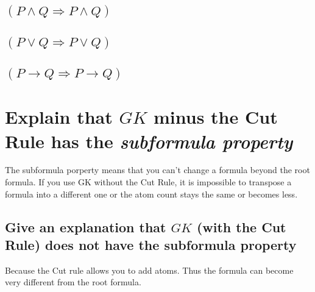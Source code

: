 \documentclass{article}
\begin{document}
\subsection{$(P\wedge Q \Rightarrow P \wedge Q)$}
\begin{prooftree}
\end{prooftree}
\subsection{$(P\vee Q \Rightarrow P \vee Q)$}
\begin{prooftree}
\end{prooftree}
\subsection{$(P \to Q \Rightarrow P \to Q)$}
\begin{prooftree}
\end{prooftree}
\section{Explain that $GK$ minus the Cut Rule has the \emph{subformula property}}
The subformula porperty means that you can't change a formula beyond the root
formula.
If you use GK without the Cut Rule, it is impossible to transpose a formula into
a different one or the atom count stays the same or becomes less.
\subsection{Give an explanation that $GK$ (with the Cut Rule) does not have
the subformula property}
Because the Cut rule allows you to add atoms. Thus the formula can become
very different from the root formula.
\newpage
\end{document}
